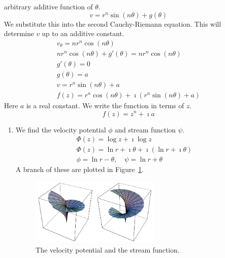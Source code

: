 {\begin{Solution}
\begin{enumerate}
    arbitrary additive function of $\theta$.
    \[
    v = r^n \sin(n \theta) + g(\theta)
    \]
    We substitute this into the second Cauchy-Riemann equation.  This will 
    determine $v$ up to an additive constant.
    \begin{gather*}
      v_\theta = n r^n \cos(n \theta)
      \\
      n r^n \cos(n \theta) + g'(\theta) = n r^n \cos(n \theta)
      \\
      g'(\theta) = 0
      \\
      g(\theta) = a
      \\
      v = r^n \sin(n \theta) + a
      \\
      f(z) = r^n \cos(n \theta) + \imath ( r^n \sin(n \theta) + a )
    \end{gather*}
    Here $a$ is a real constant.  We write the function in terms of $z$.
    \[
    f(z) = z^n + \imath a
    \]
  \end{enumerate}
\end{Solution}











\begin{Solution}
  \label{solution potential flow log z-1 log z+1}
  \begin{enumerate}
  \item 
    We find the velocity potential $\phi$ and stream function $\psi$.
    \begin{gather*}
      \Phi(z) = \log z + \imath \log z
      \\
      \Phi(z) = \ln r + \imath \theta + \imath (\ln r + \imath \theta)
      \\
      \phi = \ln r - \theta, \quad \psi = \ln r + \theta
    \end{gather*}
    A branch of these are plotted in 
    Figure~\ref{figure velocity-stream-logzilogz}.
    \begin{figure}[htb!]
      \begin{center}
        \includegraphics[width=0.6\textwidth]{fcv/analytic/velocity-stream-logzilogz}
      \end{center}
      \caption{The velocity potential and the stream function.}
      \label{figure velocity-stream-logzilogz}
    \end{figure}
    

\end{enumerate}
\end{Solution}}
